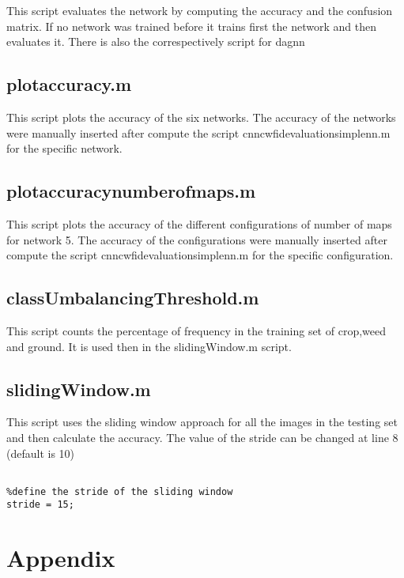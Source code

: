 \documentclass[]{report}
\begin{document}
This script evaluates the network by computing the accuracy and the confusion matrix. If no network was trained before it trains first the network and then evaluates it. There is also the correspectively script for dagnn

\section{plot\textunderscore accuracy.m}

This script plots the accuracy of the six networks. The accuracy of the networks were manually inserted after compute the script cnn\textunderscore cwfid\textunderscore evaluation\textunderscore simplenn.m for the specific network.

\section{plot\textunderscore accuracy\textunderscore number\textunderscore of\textunderscore maps.m}

This script plots the accuracy of the different configurations of number of maps for network 5. The accuracy of the configurations were manually inserted after compute the script cnn\textunderscore cwfid\textunderscore evaluation\textunderscore simplenn.m for the specific configuration.

\section{classUmbalancingThreshold.m}

This script counts the percentage of frequency in the training set of crop,weed and ground. It is used then in the slidingWindow.m script.

\section{slidingWindow.m}

This script uses the sliding window approach for all the images in the testing set and then calculate the accuracy.
The value of the stride can be changed at line 8 (default is 10)

\begin{lstlisting}

%define the stride of the sliding window
stride = 15;

\end{lstlisting}


\chapter{Appendix}
\end{document}
